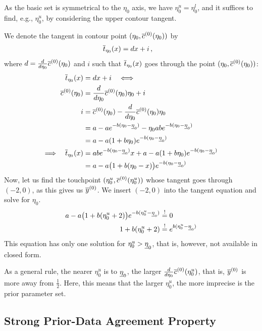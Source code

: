 As the basic set is symmetrical to the $\eta_0$ axis, we have $\eta_0^u = \eta_0^l$,
and it suffices to find, e.g., $\eta_0^u$, by considering the upper contour tangent.

We denote the tangent in contour point $(\eta_0,\overline{c}^{(0)}(\eta_0))$ by
\begin{align*}
\overline{t}_{\eta_0}(x) &= dx + i\,,
\end{align*}
where $d = \frac{d}{d\eta_0} \overline{c}^{(0)}(\eta_0)$ and
$i$ such that $\overline{t}_{\eta_0}(x)$ goes through the point $(\eta_0,\overline{c}^{(0)}(\eta_0))$:
\begin{align*}
\overline{t}_{\eta_0}(x) &= dx + i \quad \Longleftrightarrow\\
\overline{c}^{(0)}(\eta_0) &= \frac{d}{d\eta_0} \overline{c}^{(0)}(\eta_0) \eta_0 + i \\
i &= \overline{c}^{(0)}(\eta_0) -\frac{d}{d\eta_0} \overline{c}^{(0)}(\eta_0) \eta_0 \\
  &= a - a e^{-b(\eta_0 - \underline{\eta}_0)} - \eta_0 ab e^{-b(\eta_0 - \underline{\eta}_0)} \\
  &= a - a (1 + b \eta_0) e^{-b(\eta_0 - \underline{\eta}_0)} \\
\Longrightarrow\quad
\overline{t}_{\eta_0}(x) &= ab e^{-b(\eta_0 - \underline{\eta}_0)} x + a - a (1 + b \eta_0) e^{-b(\eta_0 - \underline{\eta}_0)} \\
                   &= a - a \big(1 + b(\eta_0-x)\big) e^{-b(\eta_0 - \underline{\eta}_0)}
\end{align*}
Now, let us find the touchpoint $(\eta_0^u, \overline{c}^{(0)}(\eta_0^u))$ whose tangent goes through $(-2,0)$, as this gives us $\overline{y}^{(0)}$.
We insert $(-2,0)$ into the tangent equation and solve for $\eta_0$.
\begin{align}
a - a \big(1 + b(\eta_0^u + 2)\big) e^{-b(\eta_0^u - \underline{\eta}_0)} &\stackrel{!}{=} 0 \nonumber\\
1 + b(\eta_0^u + 2) &\stackrel{!}{=} e^{b(\eta_0^u - \underline{\eta}_0)} \label{eq:eta0u}
\end{align}
This equation has only one solution for $\eta_0^u > \underline{\eta}_0$, that is,
however, not available in closed form.

As a general rule, the nearer $\eta_0^u$ is to $\underline{\eta}_0$, the larger $\frac{d}{d\eta_0} \overline{c}^{(0)}(\eta_0^u)$,
that is, $\overline{y}^{(0)}$ %
is more away from $\frac{1}{2}$.
Here, this means that the larger $\eta_0^u$, the more imprecise is the prior parameter set.


\subsection{Strong Prior-Data Agreement Property}
\label{sec:spda-property}

